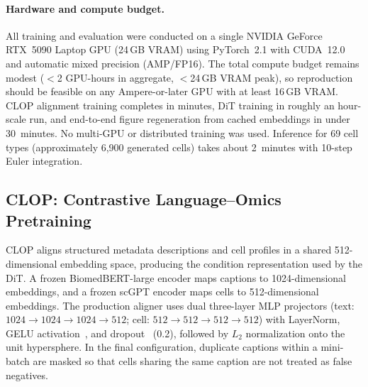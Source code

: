 \documentclass[fleqn,10pt,lineno]{wlpeerj}
\begin{document}
\paragraph{Hardware and compute budget.}
All training and evaluation were conducted on a single NVIDIA GeForce RTX~5090 Laptop GPU (24\,GB VRAM) using PyTorch~2.1 with CUDA~12.0 and automatic mixed precision (AMP/FP16). The total compute budget remains modest ($<$2 GPU-hours in aggregate, $<$24\,GB VRAM peak), so reproduction should be feasible on any Ampere-or-later GPU with at least 16\,GB VRAM. CLOP alignment training completes in minutes, DiT training in roughly an hour-scale run, and end-to-end figure regeneration from cached embeddings in under 30~minutes. No multi-GPU or distributed training was used. Inference for 69 cell types (approximately 6,900 generated cells) takes about 2~minutes with 10-step Euler integration.

\subsection*{CLOP: Contrastive Language--Omics Pretraining}\label{sec:clop}

CLOP aligns structured metadata descriptions and cell profiles in a shared 512-dimensional embedding space, producing the condition representation used by the DiT. A frozen BiomedBERT-large encoder maps captions to 1024-dimensional embeddings, and a frozen scGPT encoder maps cells to 512-dimensional embeddings. The production aligner uses dual three-layer MLP projectors (text: $1024 \to 1024 \to 1024 \to 512$; cell: $512 \to 512 \to 512 \to 512$) with LayerNorm, GELU activation~\citep{ref-gelu}, and dropout~\citep{ref-dropout} (0.2), followed by $L_2$ normalization onto the unit hypersphere. In the final configuration, duplicate captions within a mini-batch are masked so that cells sharing the same caption are not treated as false negatives.
\end{document}
